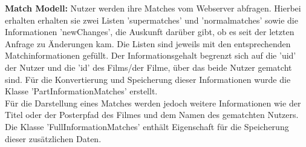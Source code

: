 \noindent
\textbf{Match Modell:}
Nutzer werden ihre Matches vom Webserver abfragen. Hierbei erhalten erhalten sie zwei Listen 'supermatches' und 'normalmatches' sowie die Informationen 'newChanges', die Auskunft darüber gibt, ob es seit der letzten Anfrage zu Änderungen kam. Die Listen sind jeweils mit den entsprechenden Matchinformationen gefüllt. Der Informationsgehalt begrenzt sich auf die 'uid' der Nutzer und die 'id' des Films/der Filme, über das beide Nutzer gematcht sind. Für die Konvertierung und Speicherung dieser Informationen wurde die Klasse 'PartInformationMatches' erstellt. \\
Für die Darstellung eines Matches werden jedoch weitere Informationen wie der Titel oder der Posterpfad des Filmes und dem Namen des gematchten Nutzers. Die Klasse 'FullInformationMatches' enthält Eigenschaft für die Speicherung dieser zusätzlichen Daten.
